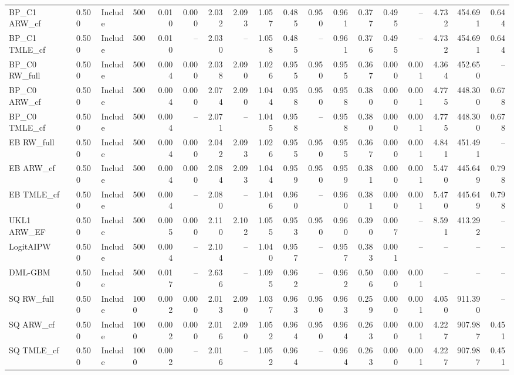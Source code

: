 \begin{tabular}{llllrrrrrrrrrrrrrr}
BP\_C1 ARW\_cf & 0.500 & Include & 500 & 0.010 & 0.000 & 2.032 & 2.093 & 1.057 & 0.485 & 0.950 & 0.961 & 0.377 & 0.495 & -- & 4.732 & 454.691 & 0.644 \\
BP\_C1 TMLE\_cf & 0.500 & Include & 500 & 0.010 & -- & 2.030 & -- & 1.058 & 0.485 & -- & 0.961 & 0.376 & 0.495 & -- & 4.732 & 454.691 & 0.644 \\
BP\_C0 RW\_full & 0.500 & Include & 500 & 0.004 & 0.000 & 2.038 & 2.090 & 1.026 & 0.955 & 0.950 & 0.955 & 0.367 & 0.000 & 0.001 & 4.364 & 452.650 & -- \\
BP\_C0 ARW\_cf & 0.500 & Include & 500 & 0.004 & 0.000 & 2.074 & 2.090 & 1.044 & 0.958 & 0.950 & 0.958 & 0.380 & 0.000 & 0.001 & 4.775 & 448.300 & 0.678 \\
BP\_C0 TMLE\_cf & 0.500 & Include & 500 & 0.004 & -- & 2.071 & -- & 1.045 & 0.958 & -- & 0.958 & 0.380 & 0.000 & 0.001 & 4.775 & 448.300 & 0.678 \\
EB RW\_full & 0.500 & Include & 500 & 0.004 & 0.000 & 2.042 & 2.093 & 1.026 & 0.955 & 0.950 & 0.955 & 0.367 & 0.000 & 0.001 & 4.841 & 451.491 & -- \\
EB ARW\_cf & 0.500 & Include & 500 & 0.004 & 0.000 & 2.084 & 2.093 & 1.044 & 0.959 & 0.950 & 0.959 & 0.381 & 0.000 & 0.001 & 5.470 & 445.649 & 0.798 \\
EB TMLE\_cf & 0.500 & Include & 500 & 0.004 & -- & 2.080 & -- & 1.046 & 0.960 & -- & 0.960 & 0.381 & 0.000 & 0.001 & 5.470 & 445.649 & 0.798 \\
UKL1 ARW\_EF & 0.500 & Include & 500 & 0.005 & 0.000 & 2.110 & 2.102 & 1.055 & 0.953 & 0.950 & 0.960 & 0.390 & 0.007 & -- & 8.591 & 413.292 & -- \\
LogitAIPW & 0.500 & Include & 500 & 0.004 & -- & 2.104 & -- & 1.040 & 0.957 & -- & 0.957 & 0.383 & 0.001 & -- & -- & -- & -- \\
DML-GBM & 0.500 & Include & 500 & 0.017 & -- & 2.636 & -- & 1.095 & 0.962 & -- & 0.962 & 0.506 & 0.000 & 0.001 & -- & -- & -- \\
SQ RW\_full & 0.500 & Include & 1000 & 0.002 & 0.000 & 2.013 & 2.090 & 1.037 & 0.963 & 0.950 & 0.963 & 0.259 & 0.000 & 0.001 & 4.050 & 911.390 & -- \\
SQ ARW\_cf & 0.500 & Include & 1000 & 0.002 & 0.000 & 2.016 & 2.090 & 1.052 & 0.964 & 0.950 & 0.964 & 0.263 & 0.000 & 0.001 & 4.227 & 907.987 & 0.451 \\
SQ TMLE\_cf & 0.500 & Include & 1000 & 0.002 & -- & 2.016 & -- & 1.052 & 0.964 & -- & 0.964 & 0.263 & 0.000 & 0.001 & 4.227 & 907.987 & 0.451 \\

\end{tabular}

